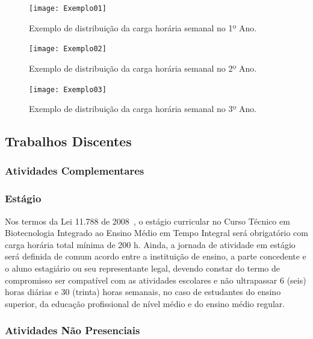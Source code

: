\documentclass[11pt,fleqn]{book} %
\begin{document}
\begin{figure}[!htp]
	\centering
	\texttt{[image: Exemplo01]}
	\caption{Exemplo de distribuição da carga horária semanal no 1º Ano.}
	\label{fig:DiagramaSemanal01}
\end{figure}

\begin{figure}[!htp]
	\centering	
	\texttt{[image: Exemplo02]}
	\caption{Exemplo de distribuição da carga horária semanal no 2º Ano.}
	\label{fig:DiagramaSemanal02}
\end{figure}

\begin{figure}[!htp]
	\centering	
	\texttt{[image: Exemplo03]}
	\caption{Exemplo de distribuição da carga horária semanal no 3º Ano.}
	\label{fig:DiagramaSemanal03}
\end{figure}


\subsection{Trabalhos Discentes}\label{trabdiscentes}
\indent

\subsubsection{Atividades Complementares}
\indent

\subsubsection{Estágio}
\indent

Nos termos da Lei 11.788 de 2008~\cite{Lei11788De2008}, o estágio curricular no Curso Técnico em Biotecnologia Integrado ao Ensino Médio em Tempo Integral será obrigatório  com carga horária total mínima de 200 h.
Ainda, a jornada de atividade em estágio será definida de comum acordo entre a instituição de ensino, a parte concedente e o aluno estagiário ou seu representante legal, devendo constar do termo de compromisso ser compatível com as atividades escolares e não ultrapassar 6 (seis) horas diárias e 30 (trinta) horas semanais, no caso de estudantes do ensino superior, da educação profissional de nível médio e do ensino médio regular. 



\subsubsection{Atividades Não Presenciais}
\indent
\end{document}
